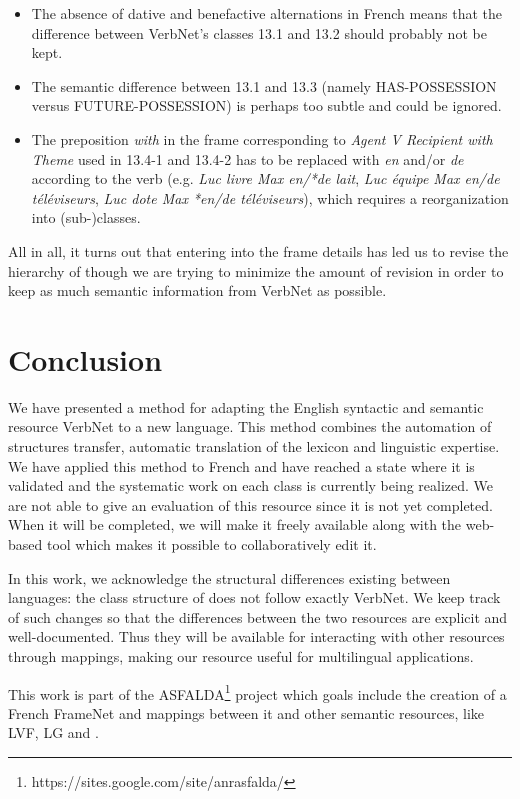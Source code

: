 \begin{itemize}

    \item  The absence of dative and benefactive alternations in French means that
    the difference between VerbNet's classes 13.1 and 13.2 should probably not be
    kept.

    \item  The semantic difference between 13.1 and 13.3 (namely HAS-POSSESSION
    versus FUTURE-POSSESSION) is perhaps too subtle and could be ignored.

    \item  The preposition \emph{with} in the frame corresponding to \emph{Agent V
    Recipient {with} Theme} used in 13.4-1 and 13.4-2 has to be replaced with
    \emph{en} and/or \emph{de} according to the verb (e.g. \emph{Luc livre Max
    en/*de lait}, \emph{Luc équipe Max en/de téléviseurs}, \emph{Luc dote Max
    *en/de téléviseurs}), which requires a reorganization into (sub-)classes.

\end{itemize}

All in all, it turns out that entering into the frame details has led us to
revise the hierarchy of \verbenet{} though we are trying to minimize the amount
of revision in order to keep as much semantic information from VerbNet as
possible.


\section{Conclusion} We have presented a method for adapting the English
syntactic and semantic resource VerbNet to a new language. This method combines
the automation of structures transfer, automatic translation of the lexicon and
linguistic expertise. We have applied this method to French and have reached a
state where it is validated and the systematic work on each class is currently
being realized.  We are not  able to give an evaluation of this resource since
it is not yet completed. When it will be completed, we will make it freely
available along with the web-based tool which makes it possible to
collaboratively edit it.

In this work, we acknowledge the structural differences existing between
languages: the class structure of \verbenet{} does not follow exactly VerbNet.
We keep track of such changes so that the differences between the two resources
are explicit and well-documented. Thus they will be available for interacting
with other resources through mappings, making our resource useful for
multilingual applications.

This work is part of the
ASFALDA\footnote{https://sites.google.com/site/anrasfalda/} project which goals
include the creation of a French FrameNet and mappings between it and other
semantic resources, like LVF, LG and \verbenet{}.

